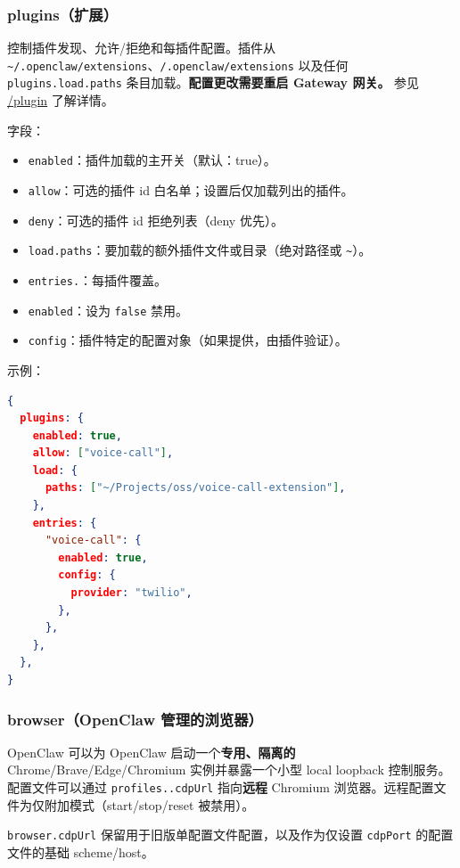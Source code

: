 \subsubsection{plugins（扩展）}


控制插件发现、允许/拒绝和每插件配置。插件从 \texttt{\textasciitilde{}/.openclaw/extensions}、\texttt{/.openclaw/extensions} 以及任何 \texttt{plugins.load.paths} 条目加载。\textbf{配置更改需要重启 Gateway 网关。}
参见 \href{/tools/plugin}{/plugin} 了解详情。

字段：

\begin{itemize}
  \item \texttt{enabled}：插件加载的主开关（默认：true）。
  \item \texttt{allow}：可选的插件 id 白名单；设置后仅加载列出的插件。
  \item \texttt{deny}：可选的插件 id 拒绝列表（deny 优先）。
  \item \texttt{load.paths}：要加载的额外插件文件或目录（绝对路径或 \texttt{\textasciitilde{}}）。
  \item \texttt{entries.}：每插件覆盖。
  \item \texttt{enabled}：设为 \texttt{false} 禁用。
  \item \texttt{config}：插件特定的配置对象（如果提供，由插件验证）。
\end{itemize}


示例：

\begin{lstlisting}[language=json]
{
  plugins: {
    enabled: true,
    allow: ["voice-call"],
    load: {
      paths: ["~/Projects/oss/voice-call-extension"],
    },
    entries: {
      "voice-call": {
        enabled: true,
        config: {
          provider: "twilio",
        },
      },
    },
  },
}
\end{lstlisting}


\subsubsection{browser（OpenClaw 管理的浏览器）}


OpenClaw 可以为 OpenClaw 启动一个\textbf{专用、隔离的} Chrome/Brave/Edge/Chromium 实例并暴露一个小型 local loopback 控制服务。
配置文件可以通过 \texttt{profiles..cdpUrl} 指向\textbf{远程} Chromium 浏览器。远程配置文件为仅附加模式（start/stop/reset 被禁用）。

\texttt{browser.cdpUrl} 保留用于旧版单配置文件配置，以及作为仅设置 \texttt{cdpPort} 的配置文件的基础 scheme/host。

